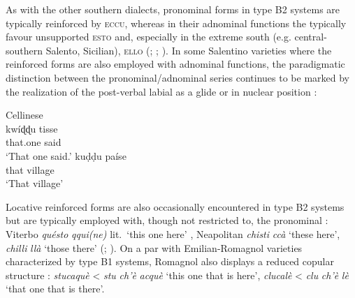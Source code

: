 \documentclass[output=paper]{langsci/langscibook}
\begin{document}
As with the other southern  dialects, pronominal forms in type B2
systems are typically reinforced by \textsc{eccu}, whereas in their adnominal
functions the  typically favour unsupported \textsc{esto} and,
especially in the extreme south (e.g. central-southern Salento, Sicilian),
\textsc{ello} (\citealt[74]{Parascandola:1976a}; \citealt[156,
158f]{Mancarella:1998a}; \citealt[69]{Abbate:1995a}). In some Salentino
varieties where the reinforced forms are also employed with adnominal
functions, the paradigmatic distinction between the pronominal/adnominal series
continues to be marked by the realization of the post-verbal labial as a glide
or in nuclear position \citep[158]{Mancarella:1998a}:

\ea Cellinese \citep{Mancarella:1998a}\\
    \ea \gll kwíɖɖu  tisse\\
             that.one  said\\
        \glt \enquote*{That one said.}
    \ex
    \gll kuḍḍu  paíse\\
         that  village\\
    \glt \enquote*{That village}
    \z
\z

Locative reinforced forms are also occasionally encountered in type B2
systems but are typically employed with, though not restricted to, the
pronominal : Viterbo \emph{quésto} \emph{qqui(ne)} lit.\ ‘this
one here’ \citep[484f]{Petroselli:2009a}, Neapolitan \emph{chisti} \emph{ccà}
‘these here’, \emph{chilli} \emph{llà} ‘those there’
(\citealt[168]{Iandolo:1994a}; \citealt[208, 212]{Iandolo:2001a}). On a par
with Emilian-Romagnol varieties characterized by type B1 systems,
Romagnol also displays a reduced copular structure \citep[65]{Masotti:1999a}:
\emph{stucaquè} < \emph{stu} \emph{ch’è} \emph{acquè} ‘this one that is here’,
\emph{clucalè} < \emph{clu} \emph{ch’è} \emph{lè} ‘that one that is there’.
\end{document}

